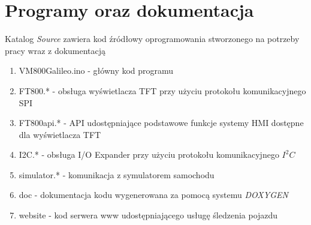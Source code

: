 \documentclass{xmgr}
\begin{document}
\chapter{Programy oraz dokumentacja}
Katalog \emph{Source} zawiera kod źródłowy oprogramowania stworzonego na potrzeby pracy wraz z dokumentacją 
\begin{enumerate} 
	\item VM800Galileo.ino - główny kod programu
	\item FT800.* - obsługa wyświetlacza TFT przy użyciu protokołu komunikacyjnego SPI
	\item FT800api.* - API udostępniające podstawowe funkcje systemy HMI dostępne dla wyświetlacza TFT
	\item I2C.* - obsługa I/O Expander przy użyciu protokołu komunikacyjnego $I^2C$
	\item simulator.* - komunikacja z symulatorem samochodu
	\item doc - dokumentacja kodu wygenerowana za pomocą systemu \emph{DOXYGEN}
	\item website - kod serwera www udostępniającego usługę śledzenia pojazdu 
\end{enumerate}




\listoftables

\listoffigures

\oswiadczenie
\end{document}
